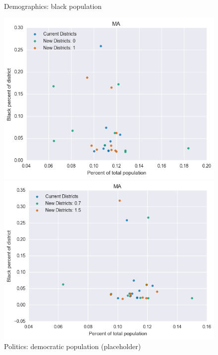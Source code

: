 \begin{figure}[htb!] \centering
\caption{ Demographics: black population }
\includegraphics[width=4.5in]{../analysis/MA/analysis_scatter.png}
\caption{ Politics: democratic population (placeholder)}
\includegraphics[width=4.5in]{../analysis/MA/analysis_scatter2.png}
\end{figure}

\clearpage
\newpage

